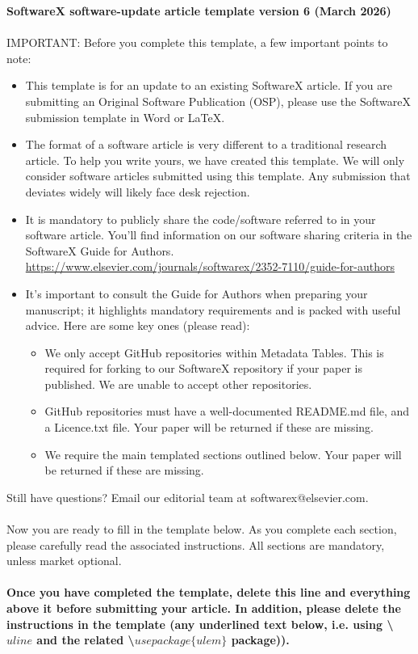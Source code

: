 \documentclass[preprint,12pt, a4paper]{elsarticle}
\begin{document}
\begin{frontmatter}

\noindent
\textbf{SoftwareX software-update article template version 6 (March 2026)}
\\
\\
 IMPORTANT: 
 Before you complete this template, a few important points to note:
 \begin{itemize}
 \item This template is for an update to an existing SoftwareX article. If you are submitting an Original Software Publication (OSP), please use the SoftwareX submission template in Word or LaTeX. 
\item The format of a software article is very different to a traditional research article. To help you write yours, we have created this template. We will only consider software articles submitted using this template. Any submission that deviates widely will likely face desk rejection.
\item It is mandatory to publicly share the code/software referred to in your software article. You’ll find information on our software sharing criteria in the SoftwareX Guide for Authors.  \url{https://www.elsevier.com/journals/softwarex/2352-7110/guide-for-authors}
\item It’s important to consult the Guide for Authors when preparing your manuscript; it highlights mandatory requirements and is packed with useful advice. Here are some key ones (please read):
	\begin{itemize}
    \item We only accept GitHub repositories within Metadata Tables. This is required for forking to our SoftwareX repository if your paper is published. We are unable to accept other repositories.
	\item GitHub repositories must have a well-documented README.md file, and a Licence.txt file. Your paper will be returned if these are missing.
	\item We require the main templated sections outlined below. Your paper will be returned if these are missing.
    \end{itemize}


\end{itemize}

\noindent
Still have questions? Email our editorial team at softwarex@elsevier.com.
\\
\\
\noindent
Now you are ready to fill in the template below. As you complete each section, please carefully read the associated instructions. All sections are mandatory, unless market optional.
\\
\\
\textbf{Once you have completed the template, delete this line and everything above it before submitting your article. In addition, please delete the instructions in the template (any underlined text below, i.e. using \textbackslash $uline$ and the related \textbackslash$usepackage\{ulem\}$ package)).}




\end{frontmatter}
\end{document}
